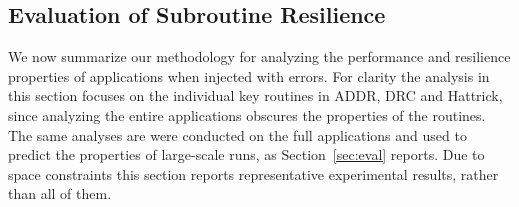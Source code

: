 \documentclass[10pt, conference, compsocconf]{IEEEtran}
\begin{document}
\subsection{Evaluation of Subroutine Resilience}
\label{sec:res_tech:eval}

We now summarize our methodology for analyzing the performance and resilience properties of applications when injected with errors.
For clarity the analysis in this section focuses on the individual key routines in ADDR, DRC and Hattrick, since analyzing the entire applications obscures the properties of the routines.
The same analyses are were conducted on the full applications and used to predict the properties of large-scale runs, as Section~\ref{sec:eval} reports.
Due to space constraints this section reports representative experimental results, rather than all of them.
\end{document}
